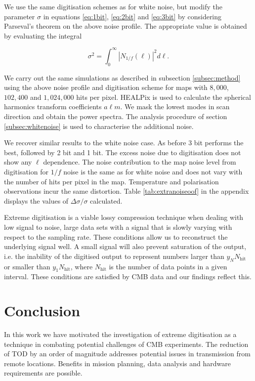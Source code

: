 \documentclass[apj]{emulateapj}
\begin{document}
We use the same digitisation schemes as for white noise, but modify the parameter $\sigma$ in equations \ref{eq:1bit}, \ref{eq:2bit} and \ref{eq:3bit} by considering Parseval's theorem on the above noise profile. The appropriate value is obtained by evaluating the integral

\begin{equation}
\sigma^2 = \int_0^\infty \left| N_{1/f}(\ell) \right|^2 d\ell.
\end{equation}

We carry out the same simulations as described in subsection \ref{subsec:method} using the above noise profile and digitisation scheme for maps with $8,000$, $102,400$ and $1,024,000$ hits per pixel. HEALPix is used to calculate the spherical harmonics transform coefficients $a\ell m$. We mask the lowest modes in scan direction and obtain the power spectra. The analysis procedure of section \ref{subsec:whitenoise} is used to characterise the additional noise.

We recover similar results to the white noise case. As before 3 bit performs the best, followed by 2 bit and 1 bit. The excess noise due to digitisation does not show any $\ell$ dependence. The noise contribution to the map noise level from digitisation for $1/f$ noise is the same as for white noise and does not vary with the number of hits per pixel in the map. Temperature and polarisation observations incur the same distortion. Table \ref{tab:extranoiseoof} in the appendix displays the values of $\Delta \sigma / \sigma$ calculated.

Extreme digitisation is a viable lossy compression technique when dealing with low signal to noise, large data sets with a signal that is slowly varying with respect to the sampling rate. These conditions allow us to reconstruct the underlying signal well. A small signal will also prevent saturation of the output, i.e. the inability of the digitised output to represent numbers larger than $y_N N_{\mathrm{hit}}$ or smaller than $y_1 N_{\mathrm{hit}}$, where $N_{\mathrm{hit}}$ is the number of data points in a given interval. These conditions are satisfied by CMB data and our findings reflect this.

\section{Conclusion}
\label{sec:conclusions}

In this work we have motivated the investigation of extreme digitisation as a technique in combating potential challenges of CMB experiments. The reduction of TOD by an order of magnitude addresses potential issues in transmission from remote locations. Benefits in mission planning, data analysis and hardware requirements are possible.
\end{document}
